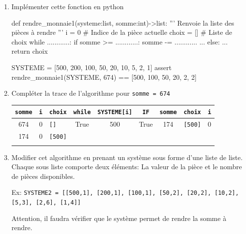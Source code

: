 \begin{exercice_cours}[]{}
\begin{enumerate}
	\item Implémenter cette fonction en python
	
	
	\begin{CodePythontexAlt}[TaillePolice=\normalsize, Largeur=1\linewidth,Centre,PremLigne=1, Lignes=false,]{}
def rendre_monnaie1(systeme:list, somme:int)->list:
    ''' Renvoie la liste des pièces à rendre '''
    i = 0					# Indice de la pièce actuelle
    choix = []				# Liste de choix
    while ............:
        if somme >= ............:
            somme -= ............
            ...
        else:
            ...
    return choix

SYSTEME = [500, 200, 100, 50, 20, 10, 5, 2, 1]
assert rendre_monnaie1(SYSTEME, 674) == [500, 100, 50, 20, 2, 2]
	
	\end{CodePythontexAlt}
	
	
\item Compléter la trace de l'algorithme pour \verb+somme = 674+

\renewcommand{\arraystretch}{1}
\begin{tabular}{|c|c|p{3.5cm}|c|c|c|c|p{3.5cm}|c|}
\hline
\verb+somme+ &
\verb+i+ &
\verb+choix+ &
\verb+while+ &
\verb+SYSTEME[i]+ &
\verb+IF+&
\verb+somme+ &
\verb+choix+ &
\verb+i+ \\ \hline
674 & 0 &\verb+[]+ &True & 500 &True & 174 & \verb+[500]+ & 0 \\ \hline 
174&0&\verb+[500]+&&&&&&\\ \hline
&&&&&&&&\\ \hline

\end{tabular}

\item Modifier cet algorithme en prenant un système sous forme d'une liste de liste. Chaque sous liste comporte deux éléments: La valeur de la pièce et le nombre de pièces disponibles.

Ex: \verb+SYSTEME2 = [[500,1], [200,1], [100,1], [50,2], [20,2], [10,2], [5,3], [2,6], [1,4]]+

Attention, il faudra vérifier que le système permet de rendre la somme à rendre.

\end{enumerate}
\end{exercice_cours}
\medskip

